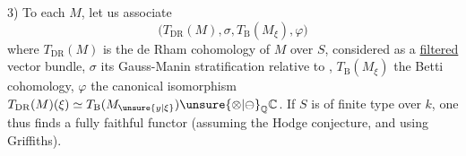 3) To each $M$, let us associate
\[
\bigl(T_{\mathrm{DR}}(M),\sigma,T_{\mathrm B}(M_\xi),\varphi\bigr)
\]
where $T_{\mathrm{DR}}(M)$ is the de Rham cohomology of $M$ over $S$, considered as a \uline{filtered} vector bundle, $\sigma$ its Gauss-Manin stratification relative to , $T_{\mathrm B}(M_\xi)$ the Betti cohomology,
$\varphi$ the canonical isomorphism $T_{\mathrm{DR}}(M)(\xi)\simeq T_{\mathrm B}(M_{\unsure{y|\xi}})\unsure{\otimes|\ominus}_{\mathbb Q}\mathbb C$. If $S$ is of finite type over $k$, one thus finds a fully faithful functor (assuming the Hodge conjecture, and using Griffiths).
